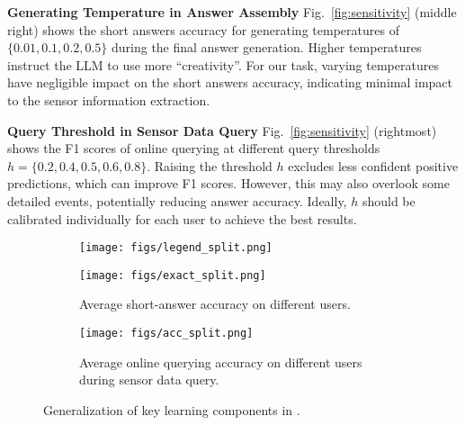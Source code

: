 \textbf{Generating Temperature in Answer Assembly}
Fig.~\ref{fig:sensitivity} (middle right) shows the short answers accuracy for generating temperatures of $\{0.01, 0.1, 0.2, 0.5\}$ during the final answer generation.
Higher temperatures instruct the LLM to use more ``creativity''. For our task, varying temperatures have negligible impact on the short answers accuracy, indicating minimal impact to the sensor information extraction.

\textbf{Query Threshold in Sensor Data Query} Fig.~\ref{fig:sensitivity} (rightmost) shows the F1 scores of online querying at different query thresholds $h=\{0.2, 0.4, 0.5, 0.6, 0.8\}$. %
Raising the threshold $h$ excludes less confident positive predictions, which can improve F1 scores. However, this may also overlook some detailed events, potentially reducing answer accuracy. Ideally, $h$ should be calibrated individually for each user to achieve the best results.

\iffalse
\textbf{Temperature during answer generation}
Fig.~\ref{fig:sensitivity} (right) shows the final accuracy for temperatures of $\{0.01, 0.1, 0.2, 0.5\}$.
Temperature balances LLaMA's predictability and creativity. A higher temperature encourages exploration and can be helpful in answering creative questions. However, on the short answer dataset, temperature has little impact on final performance.
\fi


\begin{figure}[t]
  \begin{subfigure}[b]{0.55\textwidth}
        \centering
        \texttt{[image: figs/legend\_split.png]}
        \vspace{-5mm}
    \end{subfigure}

    \begin{subfigure}[b]{0.35\textwidth}
        \centering
        \texttt{[image: figs/exact\_split.png]}
        \vspace{-6mm}
        \caption{Average short-answer accuracy on different users.}
        \label{fig:exact_split}
    \end{subfigure} \hspace{0.02\textwidth} %
    \begin{subfigure}[b]{0.35\textwidth}
        \centering
        \texttt{[image: figs/acc\_split.png]}
        \vspace{-6mm}
        \caption{Average online querying accuracy on different users during sensor data query.}
        \label{fig:acc_split}
    \end{subfigure} 
    \vspace{-4mm}
    \caption{Generalization of key learning components in \Method.}
    \label{fig:generalization}
    \vspace{-4mm}
\end{figure}

